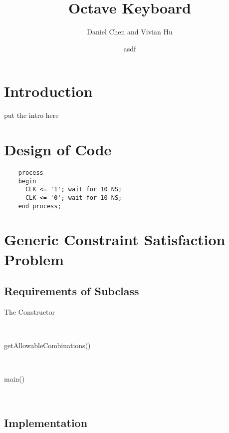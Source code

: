 \documentclass{article}
\title{Octave Keyboard}
\author{Daniel Chen and Vivian Hu}
\date{asdf}
\begin{document}
\maketitle



\section{Introduction}
  put the intro here

  \tableofcontents
\newpage




  





\section{Design of Code}

  \begin{verbatim}
    process
    begin
      CLK <= '1'; wait for 10 NS;
      CLK <= '0'; wait for 10 NS;
    end process;
  \end{verbatim}
\section{Generic Constraint Satisfaction Problem}

  \subsection{Requirements of Subclass}

    \begin{description}

      \item[The Constructor] \hfill \\

      \item[getAllowableCombinations()] \hfill \\

      \item[main()] \hfill \\

    \end{description}

  \subsection{Implementation}
\end{document}
